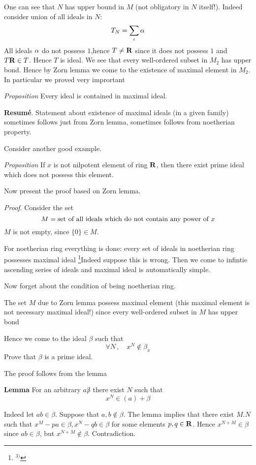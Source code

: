   One can see that $N$ has upper bound in $M$
(not obligatory in $N$ itself!). Indeed consider
union of all ideals in $N$:
       $$
      T_N=\sum_\iota \alpha
       $$
All ideals $\alpha$ do not possess $1$,hence
$T\not={\bf R}$ since it does not possess $1$ and $T{\bf R}\in T$. Hence
$T$ is ideal. We see that every well-ordered subset in $M_2$
has upper bond. Hence by Zorn lemma we come to the existence
of maximal element in $M_2$. In particular we proved very imprortant 

{\it Proposition} Every ideal is contained in maximal ideal.

\bigskip


 {\bf Resum\'e}.  
  Statement about existence of maximal ideals (in a given family) 
sometimes
follows just from  Zorn lemma, sometimes follows from noetherian
property.

Consider another good example.


{\it Proposition } If $x$ is not nilpotent element of ring ${\bf R}$,
then there exist prime ideal which does not possess this element.


Now present the proof based on Zorn lemma.

{\sl Proof}. Consider the set
       $$
M=\hbox {set of all ideals which do not contain
any  power of $x$}
       $$
$M$ is not empty, since $\{0\}\in M$.

  For noetherian ring everything is done:
every set of ideals in noetherian ring possesses  maximal ideal
 \footnote{$^{3)}$}{Indeed suppose this is wrong. Then we come
to infintie ascending series of ideals} and maximal ideal is automatically
simple.

 Now forget about the condition of being noetherian ring.

The set $M$ due to Zorn lemma possess maximal element
(this maximal element is not necessary maximal ideal!)
since every well-ordered subset in $M$ has upper bond

  Hence we come to the ideal $\beta$ such that
            $$
\forall N\,,\quad x^N\not\in \beta_x
             $$
Prove that $\beta$ is a prime ideal.

The proof follows from the lemma

{\bf Lemma} For an arbitrary $a\not \beta$ there exist $N$
such that
        $$
      x^N\in (a)+\beta
        $$

Indeed let $ab\in\beta$. Suppose that $a,b\not\in\beta$.
The lemma implies that there exist $M.N$ such that 
$x^M-pa\in\beta, x^N-qb\in \beta$ for some elements $p,q\in {\bf R}$.
Hence $x^{N+M}\in\beta$ since $ab\in\beta$,  but $x^{N+M}\not\in \beta$.
   Contradiction.

